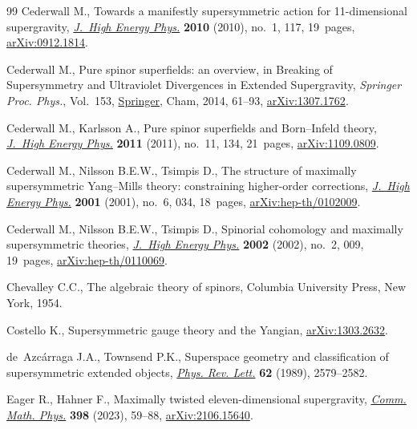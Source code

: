 \documentclass[10pt,a4paper]{amsart}
\numberwithin{equation}{section}
\begin{document}
\begin{thebibliography}{99}
Cederwall M., Towards a manifestly supersymmetric action for 11-dimensional
 supergravity, \href{https://doi.org/10.1007/JHEP01(2010)117}{\textit{J.~High Energy Phys.}} \textbf{2010} (2010), no.~1, 117,
 19~pages, \href{https://arxiv.org/abs/0912.1814}{arXiv:0912.1814}.

Cederwall M., Pure spinor superfields: an overview, in Breaking of
 Supersymmetry and Ultraviolet Divergences in Extended Supergravity,
 \textit{Springer Proc. Phys.}, Vol.~153, \href{https://doi.org/10.1007/978-3-319-03774-5_4}{Springer}, Cham,
 2014, 61--93, \href{https://arxiv.org/abs/1307.1762}{arXiv:1307.1762}.

Cederwall M., Karlsson A., Pure spinor superfields and {B}orn--{I}nfeld theory,
 \href{https://doi.org/10.1007/JHEP11(2011)134}{\textit{J.~High Energy Phys.}} \textbf{2011} (2011), no.~11, 134, 21~pages,
 \href{https://arxiv.org/abs/1109.0809}{arXiv:1109.0809}.

Cederwall M., Nilsson B.E.W., Tsimpis D., The structure of maximally
 supersymmetric {Y}ang--{M}ills theory: constraining higher-order corrections,
 \href{https://doi.org/10.1088/1126-6708/2001/06/034}{\textit{J.~High Energy Phys.}} \textbf{2001} (2001), no.~6, 034, 18~pages,
 \href{https://arxiv.org/abs/hep-th/0102009}{arXiv:hep-th/0102009}.

Cederwall M., Nilsson B.E.W., Tsimpis D., Spinorial cohomology and maximally
 supersymmetric theories, \href{https://doi.org/10.1088/1126-6708/2002/02/009}{\textit{J.~High Energy Phys.}} \textbf{2002} (2002),
 no.~2, 009, 19~pages, \href{https://arxiv.org/abs/hep-th/0110069}{arXiv:hep-th/0110069}.

Chevalley C.C., The algebraic theory of spinors, Columbia University Press, New
 York, 1954.

Costello K., Supersymmetric gauge theory and the {Y}angian, \href{https://arxiv.org/abs/1303.2632}{arXiv:1303.2632}.

de~Azc\'arraga J.A., Townsend P.K., Superspace geometry and classification of
 supersymmetric extended objects, \href{https://doi.org/10.1103/PhysRevLett.62.2579}{\textit{Phys. Rev. Lett.}} \textbf{62}
 (1989), 2579--2582.

Eager R., Hahner F., Maximally twisted eleven-dimensional supergravity,
 \href{https://doi.org/10.1007/s00220-022-04516-5}{\textit{Comm. Math. Phys.}} \textbf{398} (2023), 59--88, \href{https://arxiv.org/abs/2106.15640}{arXiv:2106.15640}.


\end{thebibliography}
\end{document}
